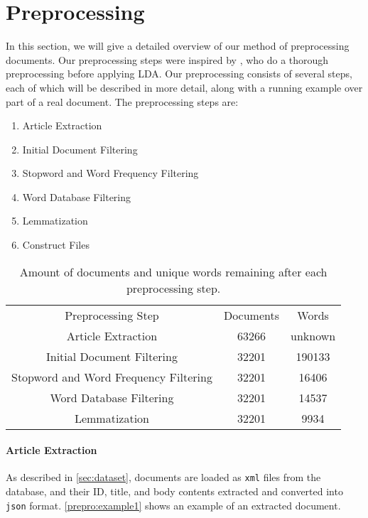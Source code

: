 \section{Preprocessing}\label{sec:prepro}

In this section, we will give a detailed overview of our method of preprocessing documents.
Our preprocessing steps were inspired by \cite{quanti}, who do a thorough preprocessing before applying LDA. 
Our preprocessing consists of several steps, each of which will be described in more detail, along with a running example over part of a real document.
The preprocessing steps are:
\begin{enumerate}[label=\alph*]
	\item Article Extraction
	\item Initial Document Filtering
	\item Stopword and Word Frequency Filtering
	\item Word Database Filtering
	\item Lemmatization 
	\item Construct Files
\end{enumerate}

\begin{table}
	\begin{tabular}{c|c|c}
		Preprocessing Step & Documents & Words\\
		Article Extraction & 63266 & unknown \\ 
		Initial Document Filtering & 32201 & 190133 \\ 
		Stopword and Word Frequency Filtering & 32201 & 16406 \\
		Word Database Filtering & 32201 & 14537 \\
		Lemmatization & 32201 & 9934\\
	\end{tabular}
	\label{tab:prepro_doc_word}
	\caption{Amount of documents and unique words remaining after each preprocessing step.}
\end{table}

\paragraph{Article Extraction}
As described in \autoref{sec:dataset}, documents are loaded as \texttt{xml} files from the database, and their ID, title, and body contents extracted and converted into \texttt{json} format.
\autoref{prepro:example1} shows an example of an extracted document.

